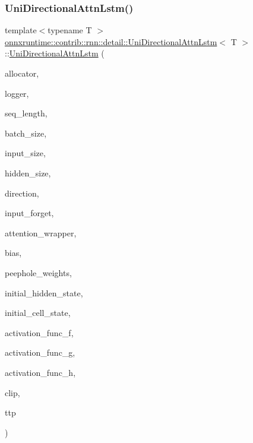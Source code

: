 \subsubsection{\texorpdfstring{Uni\+Directional\+Attn\+Lstm()}{UniDirectionalAttnLstm()}}
{\footnotesize\ttfamily template$<$typename T $>$ \\
\mbox{\hyperlink{classonnxruntime_1_1contrib_1_1rnn_1_1detail_1_1UniDirectionalAttnLstm}{onnxruntime\+::contrib\+::rnn\+::detail\+::\+Uni\+Directional\+Attn\+Lstm}}$<$ T $>$\+::\mbox{\hyperlink{classonnxruntime_1_1contrib_1_1rnn_1_1detail_1_1UniDirectionalAttnLstm}{Uni\+Directional\+Attn\+Lstm}} (\begin{DoxyParamCaption}\item[{\mbox{\hyperlink{namespaceonnxruntime_a6cdac724c5dcefded3a63f08dae58fda}{Allocator\+Ptr}}}]{allocator,  }\item[{const \mbox{\hyperlink{classonnxruntime_1_1logging_1_1Logger}{logging\+::\+Logger}} \&}]{logger,  }\item[{const int}]{seq\+\_\+length,  }\item[{const int}]{batch\+\_\+size,  }\item[{const int}]{input\+\_\+size,  }\item[{const int}]{hidden\+\_\+size,  }\item[{Direction}]{direction,  }\item[{const bool}]{input\+\_\+forget,  }\item[{\mbox{\hyperlink{classonnxruntime_1_1contrib_1_1AttentionWrapper}{Attention\+Wrapper}}$<$ T $>$ \&}]{attention\+\_\+wrapper,  }\item[{const gsl\+::span$<$ const T $>$ \&}]{bias,  }\item[{const gsl\+::span$<$ const T $>$ \&}]{peephole\+\_\+weights,  }\item[{const gsl\+::span$<$ const T $>$ \&}]{initial\+\_\+hidden\+\_\+state,  }\item[{const gsl\+::span$<$ const T $>$ \&}]{initial\+\_\+cell\+\_\+state,  }\item[{const \mbox{\hyperlink{structonnxruntime_1_1rnn_1_1detail_1_1ActivationFuncs_1_1Entry}{Activation\+Funcs\+::\+Entry}} \&}]{activation\+\_\+func\+\_\+f,  }\item[{const \mbox{\hyperlink{structonnxruntime_1_1rnn_1_1detail_1_1ActivationFuncs_1_1Entry}{Activation\+Funcs\+::\+Entry}} \&}]{activation\+\_\+func\+\_\+g,  }\item[{const \mbox{\hyperlink{structonnxruntime_1_1rnn_1_1detail_1_1ActivationFuncs_1_1Entry}{Activation\+Funcs\+::\+Entry}} \&}]{activation\+\_\+func\+\_\+h,  }\item[{const float}]{clip,  }\item[{\mbox{\hyperlink{classonnxruntime_1_1TaskThreadPool}{Task\+Thread\+Pool}} \&}]{ttp }\end{DoxyParamCaption})}

